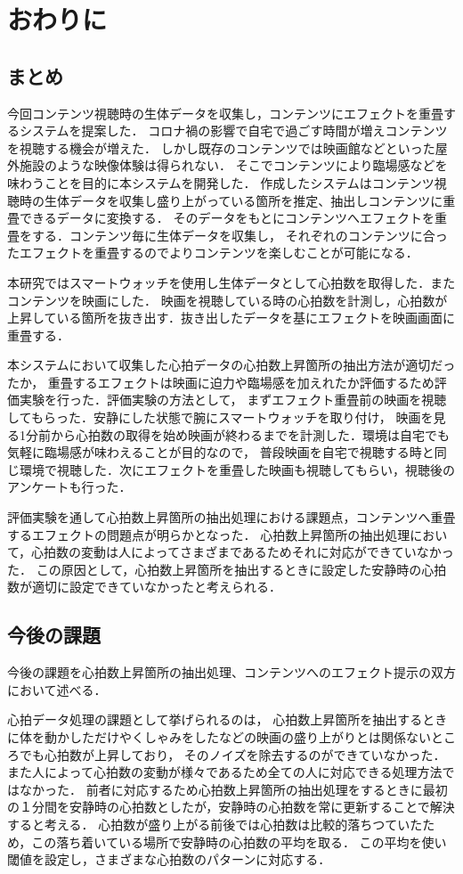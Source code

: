 \chapter{おわりに}

\section{まとめ}
今回コンテンツ視聴時の生体データを収集し，コンテンツにエフェクトを重畳するシステムを提案した．
コロナ禍の影響で自宅で過ごす時間が増えコンテンツを視聴する機会が増えた．
しかし既存のコンテンツでは映画館などといった屋外施設のような映像体験は得られない．
そこでコンテンツにより臨場感などを味わうことを目的に本システムを開発した．
作成したシステムはコンテンツ視聴時の生体データを収集し盛り上がっている箇所を推定、抽出しコンテンツに重畳できるデータに変換する．
そのデータをもとにコンテンツへエフェクトを重畳をする．コンテンツ毎に生体データを収集し，
それぞれのコンテンツに合ったエフェクトを重畳するのでよりコンテンツを楽しむことが可能になる．

本研究ではスマートウォッチを使用し生体データとして心拍数を取得した．またコンテンツを映画にした．
映画を視聴している時の心拍数を計測し，心拍数が上昇している箇所を抜き出す．抜き出したデータを基にエフェクトを映画画面に重畳する．

本システムにおいて収集した心拍データの心拍数上昇箇所の抽出方法が適切だったか，
重畳するエフェクトは映画に迫力や臨場感を加えれたか評価するため評価実験を行った．評価実験の方法として，
まずエフェクト重畳前の映画を視聴してもらった．安静にした状態で腕にスマートウォッチを取り付け，
映画を見る1分前から心拍数の取得を始め映画が終わるまでを計測した．環境は自宅でも気軽に臨場感が味わえることが目的なので，
普段映画を自宅で視聴する時と同じ環境で視聴した．次にエフェクトを重畳した映画も視聴してもらい，視聴後のアンケートも行った．

評価実験を通して心拍数上昇箇所の抽出処理における課題点，コンテンツへ重畳するエフェクトの問題点が明らかとなった．
心拍数上昇箇所の抽出処理において，心拍数の変動は人によってさまざまであるためそれに対応ができていなかった．
この原因として，心拍数上昇箇所を抽出するときに設定した安静時の心拍数が適切に設定できていなかったと考えられる．

\section{今後の課題}
今後の課題を心拍数上昇箇所の抽出処理、コンテンツへのエフェクト提示の双方において述べる．

心拍データ処理の課題として挙げられるのは，
心拍数上昇箇所を抽出するときに体を動かしただけやくしゃみをしたなどの映画の盛り上がりとは関係ないところでも心拍数が上昇しており，
そのノイズを除去するのができていなかった．また人によって心拍数の変動が様々であるため全ての人に対応できる処理方法ではなかった．
前者に対応するため心拍数上昇箇所の抽出処理をするときに最初の１分間を安静時の心拍数としたが，安静時の心拍数を常に更新することで解決すると考える．
心拍数が盛り上がる前後では心拍数は比較的落ちつていたため，この落ち着いている場所で安静時の心拍数の平均を取る．
この平均を使い閾値を設定し，さまざまな心拍数のパターンに対応する．

